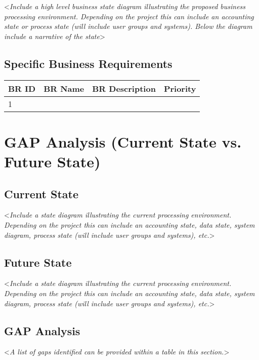 \documentclass[english,12pt]{scrartcl}
\newcommand{\comment}[1]{\textless\textit{#1}\textgreater\vspace*{1ex}}
\begin{document}
\comment{Include a high level business state diagram illustrating the proposed business processing environment.  Depending on the project this can include an accounting state or process state (will include user groups and systems).  Below the diagram include a narrative of the state}
 
 
\subsection{Specific Business Requirements}
 
 
\begin{tabular}{p{}p{}p{}p{}} \\ \toprule
BR ID &	BR Name	&BR Description &	Priority \\ \midrule
1 & & & \\ \bottomrule
\end{tabular}
 
 
\section{GAP Analysis (Current State vs. Future State)}
 
\subsection{Current State}
 
\comment{Include a state diagram illustrating the current processing environment.  Depending on the project this can include an accounting state, data state, system diagram, process state (will include user groups and systems), etc.}
 
\subsection{Future State}
 
\comment{Include a state diagram illustrating the current processing environment.  Depending on the project this can include an accounting state, data state, system diagram, process state (will include user groups and systems), etc.}
 
\subsection{GAP Analysis}
 
\comment{A list of gaps identified can be provided within a table in this section.}
 
\end{document}

